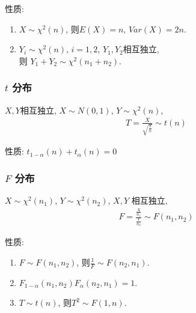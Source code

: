 性质: 
\begin{enumerate}
    \item $X\sim \chi^2(n)$, 则$E(X)=n, \, Var(X)=2n$. 
    \item $Y_i \sim \chi^2(n)$, $i=1,2$, $Y_1,Y_2$相互独立, \\则 $Y_1+Y_2\sim \chi^2(n_1+n_2)$. 
\end{enumerate}

\subsubsection{\texorpdfstring{$t $}. 分布}
\begin{definition}
    $X,Y$相互独立, $X\sim N(0,1)$, $Y\sim \chi^2(n)$, 
    \begin{align*}
        T=\frac{X}{\sqrt{\frac{Y}{n}}}\sim t(n)
    \end{align*}
\end{definition}

性质: $t_{1-\alpha}(n)+t_{\alpha}(n)=0$

\subsubsection{\texorpdfstring{$F $}. 分布}
\begin{definition}
    $X\sim \chi^2(n_1)$, $Y\sim \chi^2(n_2)$, $X,Y$ 相互独立, 
    \begin{align*}
        F=\frac{\frac{X}{n_1}}{\frac{Y}{n_2}}\sim F(n_1,n_2)
    \end{align*}
\end{definition}

性质: 
\begin{enumerate}
    \item $F\sim F(n_1,n_2)$, 则$\frac{1}{F}\sim F(n_2,n_1)$. 
    \item $F_{1-\alpha}(n_1,n_2)F_{\alpha}(n_2,n_1)=1$.
    \item $T\sim t(n)$, 则$T^2\sim F(1,n)$. 
\end{enumerate}

